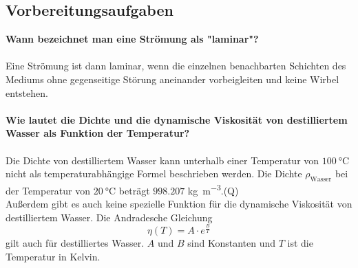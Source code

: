         \subsection{Vorbereitungsaufgaben}
            \label{sec:Vorbereitungsaufgaben}
            \textbf{Wann bezeichnet man eine Strömung als "laminar"?}\\
            \\
            Eine Strömung ist dann laminar, wenn die einzelnen benachbarten Schichten 
            des Mediums ohne gegenseitige Störung aneinander vorbeigleiten und 
            keine Wirbel entstehen. \\ 
            \\
            \textbf{Wie lautet die Dichte und die dynamische Viskosität von 
            destilliertem Wasser als Funktion der Temperatur?}\\
            \\
            Die Dichte von destilliertem Wasser kann unterhalb einer Temperatur von  
            $\SI{100}{\celsius}$ nicht als temperaturabhängige Formel 
            beschrieben werden.
            Die Dichte $\rho_{\text{Wasser}}$ bei der Temperatur von $\SI{20}{\celsius}$ beträgt $998.207$ 
            \unit[per-mode=fraction]{\kilo\gram\per\meter\tothe{3}}.(Q\cite{dichte})\\
            Außerdem gibt es auch keine spezielle Funktion für die dynamische
            Viskosität von destilliertem Wasser. Die Andradesche Gleichung 
            \begin{equation}
            \eta (T) = A \cdot e^{\frac{B}{T}}
            \label{eqn:AndradescheGleichung}
            \end{equation} 
            gilt auch für destilliertes Wasser. $A$ und $B$ sind Konstanten und $T$ ist die Temperatur in Kelvin. 
